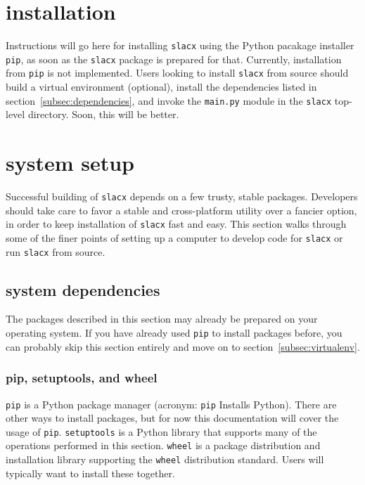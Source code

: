 \chapter{installation}
\label{ch:installation}

Instructions will go here for installing \verb|slacx| using 
the Python pacakage installer \verb|pip|,
as soon as the \verb|slacx| package is prepared for that.
Currently, installation from \verb|pip| is not implemented.
Users looking to install \verb|slacx| from source
should build a virtual environment (optional),
install the dependencies listed in section~\ref{subsec:dependencies},
and invoke the \verb|main.py| module in the \verb|slacx| top-level directory.
Soon, this will be better.


\chapter{system setup}
\label{ch:system_setup}
\lstset{language=Bash}

Successful building of \verb|slacx| depends on a few trusty, stable packages.
Developers should take care to favor a stable and cross-platform utility
over a fancier option, in order to keep installation of \verb|slacx| fast and easy.
This section walks through some of the finer points 
of setting up a computer to develop code for \verb|slacx| 
or run \verb|slacx| from source.


\section{system dependencies}

The packages described in this section 
may already be prepared on your operating system.
If you have already used \verb|pip| to install packages before,
you can probably skip this section entirely
and move on to section~\ref{subsec:virtualenv}.


\subsection{pip, setuptools, and wheel}

\verb|pip| is a Python package manager
(acronym: \verb|pip| Installs Python). 
There are other ways to install packages, but for now
this documentation will cover the usage of \verb|pip|.
\verb|setuptools| is a Python library that supports
many of the operations performed in this section.
\verb|wheel| is a package distribution and installation library 
supporting the \verb|wheel| distribution standard.
Users will typically want to install these together.

